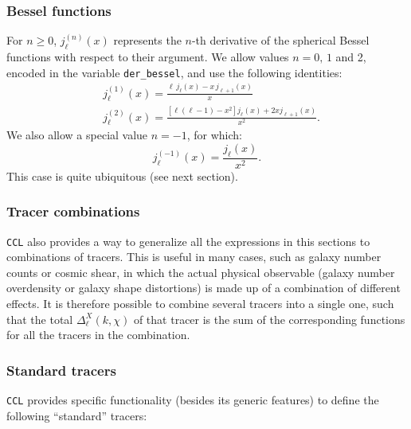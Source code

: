\documentclass[\docopts]{\docclass}
\begin{document}
\subsubsection*{Bessel functions}
  For $n\ge0$, $j^{(n)}_\ell(x)$ represents the $n$-th derivative of the spherical Bessel functions with respect to their argument. We allow values $n=0,\,1$ and 2, encoded in the variable {\tt der\_bessel}, and use the following identities:
  \begin{align}
    &j^{(1)}_\ell(x)=\frac{\ell\,j_\ell(x)-x\,j_{\ell+1}(x)}{x}\\
    &j^{(2)}_\ell(x)=\frac{[\ell(\ell-1)-x^2]j_\ell(x)+2xj_{\ell+1}(x)}{x^2}.
  \end{align}
  We also allow a special value $n=-1$, for which:
  \begin{equation}
    j^{(-1)}_\ell(x)=\frac{j_\ell(x)}{x^2}.
  \end{equation}
  This case is quite ubiquitous (see next section).

\subsubsection*{Tracer combinations}
{\tt CCL} also provides a way to generalize all the expressions in this sections
to combinations of tracers. This is useful in many cases, such as galaxy number
counts or cosmic shear, in which the actual physical observable (galaxy number
overdensity or galaxy shape distortions) is made up of a combination of
different effects. It is therefore possible to combine several tracers into a
single one, such that the total $\Delta^X_\ell(k,\chi)$ of that tracer is the
sum of the corresponding functions for all the tracers in the combination.

\subsubsection*{Standard tracers}
{\tt CCL} provides specific functionality (besides its generic features) to define the following ``standard'' tracers:
\end{document}
